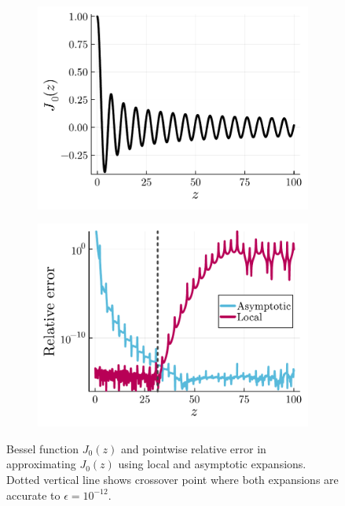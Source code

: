 \begin{figure}
  \centering
  \begin{subfigure}[b]{0.45\textwidth}
    \includegraphics[width=\textwidth]{./figures/bessel_function.pdf}
  \end{subfigure}
  \begin{subfigure}[b]{0.45\textwidth}
    \includegraphics[width=\textwidth]{./figures/pointwise_errors.pdf}
  \end{subfigure}
  \caption{Bessel function $J_0(z)$ and pointwise relative error in
  approximating $J_0(z)$ using local and asymptotic expansions. Dotted vertical
  line shows crossover point where both expansions are accurate to $\epsilon =
  10^{-12}$.}
  \label{fig:two-expansions}
\end{figure}

